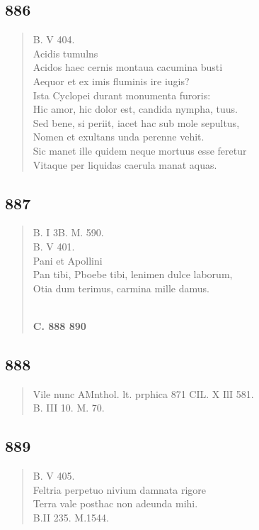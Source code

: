 \documentclass[11pt, a4paper]{report}
\begin{document}
            \subsection*{886}
      \begin{verse}
      B. V 404. \\ Acidis tumulns \\ Acidos haec cernis montaua cacumina busti \\ Aequor et ex imis fluminis ire iugis? \\ Ista Cyclopei durant monumenta furoris: \\ Hic amor, hic dolor est, candida nympha, tuus. \\ Sed bene, si periit, iacet hac sub mole sepultus, \\ Nomen et exultans unda perenne vehit. \\ Sic manet ille quidem neque mortuus esse feretur \\ Vitaque per liquidas caerula manat aquas. \\ 
      \end{verse}
  
            \subsection*{887}
      \begin{verse}
      B. I 3B. M. 590. \\ B. V 401. \\ Pani et Apollini \\ Pan tibi, Pboebe tibi, lenimen dulce laborum, \\ Otia dum terimus, carmina mille damus. \\ 
        ﻿\pagebreak 
     \marginpar{[333]} \begin{center} \textbf{C. 888 890} \end{center}
      \end{verse}
  
            \subsection*{888}
      \begin{verse}
      Vile nunc AMnthol. lt. prphica 871 CIL. X IlI 581. \\ B. III 10. M. 70. \\ 
      \end{verse}
  
            \subsection*{889}
      \begin{verse}
      B. V 405. \\ Feltria perpetuo nivium damnata rigore \\ Terra vale posthac non adeunda mihi. \\ B.II 235. M.1544. \\ 
      \end{verse}
  
\end{document}
